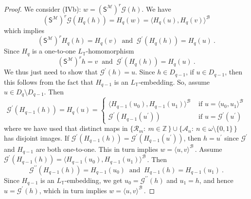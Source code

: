 \documentclass[10pt,a4paper, openany,  oldfontcommands]{memoir}
\newtheorem{open problem} [theorem] {Open Problem}
\newtheorem{open question} [theorem] {Open Question}
\renewcommand{\mathrm}{\mathsf}
\begin{document}
\begin{proof}
We consider (IVb):   $    w  =  \left(  \mathrm{S}^{  \mathcal{M}  }  \right)^r    \mathcal{G}  \left(   h   \right)   $. 
We have 
\[
\left(  \mathrm{S}^{  \mathcal{M}  }  \right)^r    \mathcal{G}  \left(  H_{q}  \left( h \right)   \right) 
= H_q (w)   = 
 \langle  H_q(u) , H_q (v)  \rangle^{  \mathcal{B}  }       
\]
which implies  
\[
\left(  \mathrm{S}^{  \mathcal{M}  }  \right)^r     H_q  (h)  =  H_q (v)  
\   \mbox{  and  }    \  
\mathcal{G}^{  \prime }  \left(  H_{q}  \left( h \right)   \right)   =  H_q  (u) 
\       .
\]
Since  $  H_q  $ is a one-to-one  $  L_{  \mathbb{T} }  $-homomorphism 
\[
\left(  \mathrm{S}^{  \mathcal{M}  }  \right)^r     h  =  v  
\   \mbox{  and  }    \  
\mathcal{G}^{  \prime }  \left(  H_{q}  \left( h \right)   \right)   =  H_q  (u) 
\       .
\]
We thus just need to show that  $   \mathcal{G}^{  \prime  }    \left(   h   \right)   =  u  $.
Since  $  h   \in D_{ q-1} $,  
if  $  u  \in  D_{  q-1}  $,  then this follows from the fact that $ H_{ q-1}  $  is an $  L_{  \mathbb{T}  }  $-embedding. 
So, assume  $  u \in D_q  \setminus  D_{ q-1}  $. 
Then 
\[
\mathcal{G}^{  \prime }  \left(  H_{q-1}  \left( h \right)   \right)   =  H_q  (u) 
=  \begin{cases} 
\langle   H_{q-1}   \left(  u_0  \right)  ,    H_{q-1}   \left(  u_1  \right)  \rangle^{  \mathcal{B}  }  
&     \mbox{  if  }    u  =  \langle  u_0,  u_1    \rangle^{  \mathcal{B}  }   
\\
\mathcal{G}^{  \prime }  \left(  H_{ q-1} ( u^{  \prime }  )  \right)      &   \mbox{  if   }   u  =   \mathcal{G}^{  \prime }  \left(     u^{  \prime }   \right)   
\end{cases}
\]
where we have used that distinct maps in   $   \lbrace  \mathcal{R}_m   :  \   m  \in  \mathbb{Z} \,   \rbrace   \cup 
 \lbrace  \mathcal{A}_n :  \   n  \in    \omega  \setminus \lbrace 0, 1   \rbrace  \,   \rbrace       $
 has disjoint images. 
 If    $  \mathcal{G}^{  \prime }  \left(  H_{q-1}  \left( h \right)   \right)   =    \mathcal{G}^{  \prime }  \left(  H_{ q-1} ( u^{  \prime }  )  \right)   $,   then $  h = u^{  \prime }  $  since    $   \mathcal{G}^{  \prime }   $  and  $  H_{ q-1} $ are both one-to-one. 
 This in turn implies    $    w  =   \langle u, v  \rangle^{  \mathcal{B}  }     \,    $.
 Assume 
 $  \mathcal{G}^{  \prime }  \left(  H_{q-1}  \left( h \right)   \right)    =  
 \langle   H_{q-1}   \left(  u_0  \right)  ,    H_{q-1}   \left(  u_1  \right)  \rangle^{  \mathcal{B}  }      \,     $. 
 Then 
 \[
  \mathcal{G}^{  \prime  \prime  }  \left(  H_{q-1}  \left( h \right)   \right)     =   H_{q-1}   \left(  u_0  \right)   
  \    \mbox{  and  }    \   
   H_{q-1}  \left( h \right)   =   H_{q-1}   \left(  u_1  \right) 
   \     .
 \]
Since  $  H_{ q-1}  $  is an $  L_{  \mathbb{T} }  $-embedding,   we get 
 $ u_0  =   \mathcal{G}^{  \prime   \prime  }    \left(   h   \right)   $ and  $  u_1 = h $,  
 and hence   $  u =   \mathcal{G}^{  \prime  }    \left(   h   \right)   $, which in turn implies 
   $    w  =   \langle u, v  \rangle^{  \mathcal{B}  }     \,    $.










\end{proof}
\end{document}
